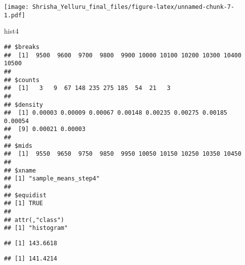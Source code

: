 \documentclass[]{article}
\newenvironment{Shaded}{\begin{snugshade}}{\end{snugshade}}
\newcommand{\KeywordTok}[1]{\textcolor[rgb]{0.13,0.29,0.53}{\textbf{#1}}}
\newcommand{\DecValTok}[1]{\textcolor[rgb]{0.00,0.00,0.81}{#1}}
\newcommand{\StringTok}[1]{\textcolor[rgb]{0.31,0.60,0.02}{#1}}
\newcommand{\CommentTok}[1]{\textcolor[rgb]{0.56,0.35,0.01}{\textit{#1}}}
\newcommand{\OperatorTok}[1]{\textcolor[rgb]{0.81,0.36,0.00}{\textbf{#1}}}
\newcommand{\NormalTok}[1]{#1}
\begin{document}
\texttt{[image: Shrisha\_Yelluru\_final\_files/figure-latex/unnamed-chunk-7-1.pdf]}

\begin{Shaded}
\begin{Highlighting}[]
\NormalTok{hist4}
\end{Highlighting}
\end{Shaded}

\begin{verbatim}
## $breaks
##  [1]  9500  9600  9700  9800  9900 10000 10100 10200 10300 10400 10500
## 
## $counts
##  [1]   3   9  67 148 235 275 185  54  21   3
## 
## $density
##  [1] 0.00003 0.00009 0.00067 0.00148 0.00235 0.00275 0.00185 0.00054
##  [9] 0.00021 0.00003
## 
## $mids
##  [1]  9550  9650  9750  9850  9950 10050 10150 10250 10350 10450
## 
## $xname
## [1] "sample_means_step4"
## 
## $equidist
## [1] TRUE
## 
## attr(,"class")
## [1] "histogram"
\end{verbatim}

\begin{Shaded}
\end{Shaded}

\begin{verbatim}
## [1] 143.6618
\end{verbatim}

\begin{Shaded}
\end{Shaded}

\begin{verbatim}
## [1] 141.4214
\end{verbatim}

\begin{Shaded}
\end{Shaded}
\end{document}
